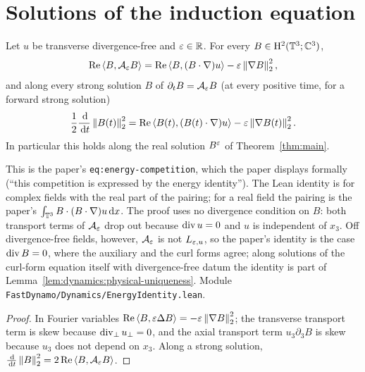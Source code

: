 \section{Solutions of the induction equation}
\label{sec:dynamics:solutions}

\begin{lemma}
  \label{lem:dynamics:energy-identity}
  \leanok
  Let $u$ be transverse divergence-free and $\varepsilon\in\mathbb{R}$.  For every $B\in\mathrm{H}^2(\mathbb{T}^3;\mathbb{C}^3)$,
  \[
    \operatorname{Re}\left\langle B,\mathcal A_\varepsilon B\right\rangle=\operatorname{Re}\left\langle B,(B\cdot\nabla)u\right\rangle-\varepsilon\left\|\nabla B\right\|_2^2,
  \]
  and along every strong solution $B$ of $\partial_tB=\mathcal A_\varepsilon B$ (at every positive
  time, for a forward strong solution)
  \[
    \frac12\frac{\,\mathrm{d}}{\,\mathrm{d} t}\left\|B(t)\right\|_2^2
    =\operatorname{Re}\left\langle B(t),(B(t)\cdot\nabla)u\right\rangle-\varepsilon\left\|\nabla B(t)\right\|_2^2 .
  \]
  In particular this holds along the real solution $B^\varepsilon$ of Theorem~\ref{thm:main}.
\end{lemma}

This is the paper's \texttt{eq:energy-competition}, which the paper displays formally (``this
competition is expressed by the energy identity'').  The Lean identity is for complex fields with
the real part of the pairing; for a real field the pairing is the paper's
$\int_{\mathbb{T}^3}B\cdot(B\cdot\nabla)u\,\mathrm{d} x$.  The proof uses no divergence condition on $B$:
both transport terms of $\mathcal A_\varepsilon$ drop out because $\operatorname{div} u=0$ and $u$ is independent of
$x_3$.  Off divergence-free fields, however, $\mathcal A_\varepsilon$ is not $L_{\varepsilon,u}$, so the
paper's identity is the case $\operatorname{div} B=0$, where the auxiliary and the curl forms agree; along
solutions of the curl-form equation itself with divergence-free datum the identity is part of
Lemma~\ref{lem:dynamics:physical-uniqueness}.  Module
\texttt{FastDynamo/Dynamics/EnergyIdentity.lean}.

\begin{proof}
  \leanok
  In Fourier variables $\operatorname{Re}\left\langle B,\varepsilon\Delta B\right\rangle=-\varepsilon\left\|\nabla B\right\|_2^2$; the transverse
  transport term is skew because $\operatorname{div}_\perp u_\perp=0$, and the axial transport term
  $u_3\partial_3B$ is skew because $u_3$ does not depend on $x_3$.  Along a strong solution,
  $\frac{\,\mathrm{d}}{\,\mathrm{d} t}\left\|B\right\|_2^2=2\operatorname{Re}\left\langle B,\mathcal A_\varepsilon B\right\rangle$.
\end{proof}

